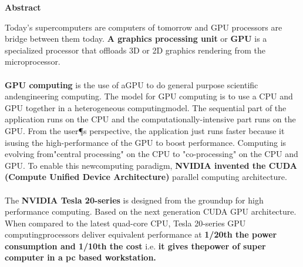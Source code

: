 \newpage
{\bf \LARGE Abstract}
\vspace{3cm}
\label{preface}

Today's supercomputers are computers of tomorrow and GPU processors are bridge between them today. \textbf{A graphics processing unit} or \textbf{GPU} is a specialized processor that offloads 3D or 2D graphics rendering from the microprocessor.\\\\

\textbf{ GPU computing} is the use of aGPU to do general purpose scientific andengineering computing. The model for GPU computing is to use a CPU and GPU together in a heterogeneous computingmodel. The sequential part of the application runs on the CPU and the computationally-intensive part runs on the GPU. From the user¶s perspective, the application just runs faster because it isusing the high-performance of the GPU to boost performance. Computing is evolving from"central processing" on the CPU to "co-processing" on the CPU and GPU. To enable this newcomputing paradigm, \textbf{NVIDIA invented the CUDA (Compute Unified Device Architecture)} parallel computing architecture.\\\\

The \textbf{NVIDIA \textregistered Tesla 20-series} is designed from the groundup for high performance computing. Based on the next generation CUDA GPU architecture. When compared to the latest quad-core CPU, Tesla 20-series GPU computingprocessors deliver equivalent performance at \textbf{1/20th the power consumption and 1/10th the cost} i.e. \textbf{it gives thepower of super computer in a pc based workstation.} 
